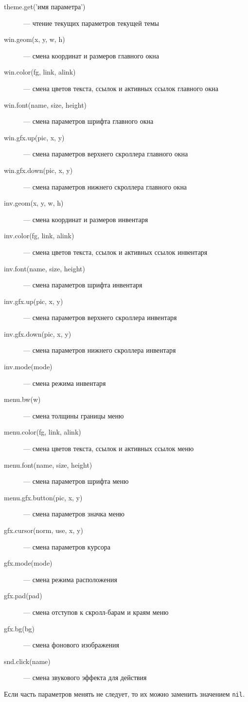 \documentclass[12pt]{article}
\begin{document}
\begin{description}
 \item[theme.get('имя параметра')] — чтение текущих параметров текущей темы
 \item[win.geom(x, y, w, h)] — смена координат и размеров главного окна
 \item[win.color(fg, link, alink)] — смена цветов текста, ссылок и активных ссылок главного окна
 \item[win.font(name, size, height)] — смена параметров шрифта главного окна
 \item[win.gfx.up(pic, x, y)] — смена параметров верхнего скроллера главного окна
 \item[win.gfx.down(pic, x, y)] — смена параметров нижнего скроллера главного окна
 \item[inv.geom(x, y, w, h)] — смена координат и размеров инвентаря
 \item[inv.color(fg, link, alink)] — смена цветов текста, ссылок и активных ссылок инвентаря
 \item[inv.font(name, size, height)] — смена параметров шрифта инвентаря
 \item[inv.gfx.up(pic, x, y)] — смена параметров верхнего скроллера инвентаря
 \item[inv.gfx.down(pic, x, y)]  — смена параметров нижнего скроллера инвентаря
 \item[inv.mode(mode)] — смена режима инвентаря
 \item[menu.bw(w)] — смена толщины границы меню
 \item[menu.color(fg, link, alink)]— смена цветов текста, ссылок и активных ссылок меню
 \item[menu.font(name, size, height)] — смена параметров шрифта меню
 \item[menu.gfx.button(pic, x, y)] — смена параметров значка меню
 \item[gfx.cursor(norm, use, x, y)] — смена параметров курсора
 \item[gfx.mode(mode)] — смена режима расположения
 \item[gfx.pad(pad)] — смена отступов к скролл-барам и краям меню
 \item[gfx.bg(bg)] — смена фонового изображения
 \item[snd.click(name)] — смена звукового эффекта для действия
\end{description}

Если часть параметров менять не следует, то их можно заменить значением \verb/nil/.
\end{document}
